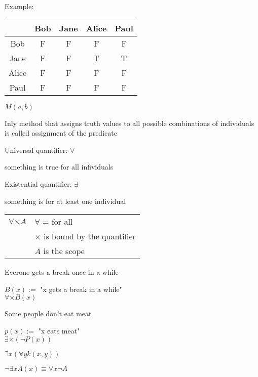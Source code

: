 \documentclass{article}
\begin{document}
Example:
\begin{tabular}{|c|cccc|}
  \hline
  & Bob & Jane & Alice & Paul \\ \hline
  Bob & F & F & F & F \\
  Jane & F & F & T & T \\
  Alice & F & F & F & F \\
  Paul & F & F & F & F \\
  \hline  
\end{tabular}

$M(a, b)$

Inly method that assigns truth values to all possible combinations of individuals is called assignment of the predicate



Universal quantifier: $\forall$

something is true for all infividuals

Existential quantifier: $\exists$

something is for at least one individual

\begin{tabular}{cl}
  $\forall \times A$ & $\forall$ = for all \\
  & $\times$ is bound by the quantifier \\
  & $A$ is the scope
\end{tabular}

Everone gets a break once in a while

$B(x) := $ "x gets a break in a while"\\
$\forall \times B\left(x\right)$

Some people don't eat meat

$p(x) := $ "x eats meat"\\
$\exists \times \left( \neg P \left( x \right)  \right)$


$\exists x \left( \forall y k \left( x, y \right) \right)$

$\neg \exists x A\left( x \right) \equiv \forall x \neg A$
\end{document}
